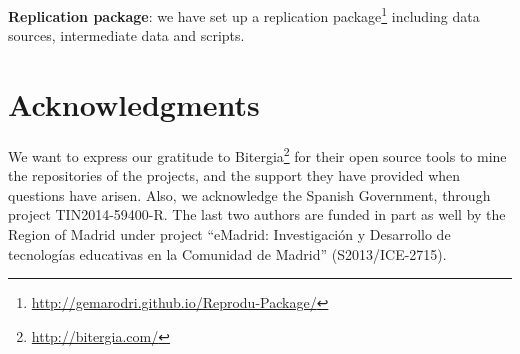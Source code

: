 \documentclass[10pt, conference]{IEEEtran}
\begin{document}
\textbf{Replication package}: we have set up a replication package\footnote{\url{http://gemarodri.github.io/Reprodu-Package/}} including data sources, intermediate data and scripts.


\section*{Acknowledgments}

We want to express our gratitude to Bitergia\footnote{\url{http://bitergia.com/}} for their open source tools to mine the repositories of the projects, and the support they have provided when questions have arisen. Also, we acknowledge the Spanish Government, through project TIN2014-59400-R. The last two authors are funded in part as well by the Region of Madrid under project ``eMadrid: Investigación y Desarrollo de tecnologías educativas en la Comunidad de Madrid'' (S2013/ICE-2715).



%
%
%




 


\end{document}
